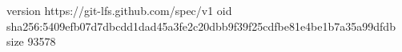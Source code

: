 version https://git-lfs.github.com/spec/v1
oid sha256:5409efb07d7dbcdd1dad45a3fe2c20dbb9f39f25cdfbe81e4be1b7a35a99dfdb
size 93578
